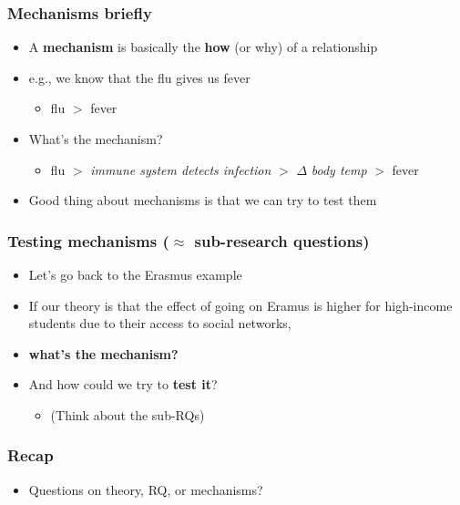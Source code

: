 \documentclass[aspectratio=43]{beamer}
\begin{document}
\begin{frame}
\frametitle{Mechanisms briefly}
\centering

\begin{itemize}
  \item A \textbf{mechanism} is basically the \textbf{how} (or why) of a relationship
  \item e.g., we know that the flu gives us fever
  \begin{itemize}
    \item flu $>$ fever
  \end{itemize}
  \item<2-> What's the mechanism?
  \begin{itemize}
    \item flu $>$ \textit{immune system detects infection} $>$ $\Delta$ \textit{body temp} $>$ fever
  \end{itemize}
  \item<3-> Good thing about mechanisms is that we can try to test them
\end{itemize}

\end{frame}

\begin{frame}
\frametitle{Testing mechanisms ($\approx$ sub-research questions)}
\centering

\begin{itemize}
  \item Let's go back to the Erasmus example
  \item If our theory is that the effect of going on Eramus is higher for high-income students due to their access to social networks,
  \item[] \textbf{what's the mechanism?}
  \item And how could we try to \textbf{test it}?
  \begin{itemize}
    \item (Think about the sub-RQs)
  \end{itemize}
\end{itemize}

\end{frame}

\begin{frame}
\frametitle{Recap}
\centering

\begin{itemize}
  \item Questions on theory, RQ, or mechanisms?
\end{itemize}

\end{frame}
\end{document}

